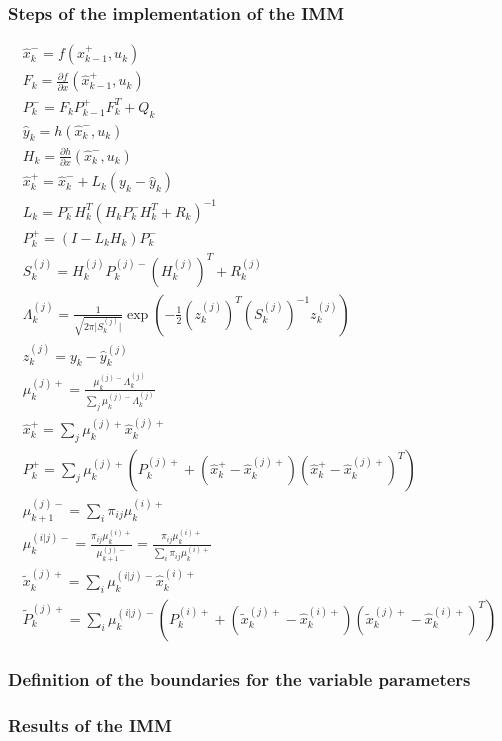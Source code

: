 \subsubsection{Steps of the implementation of the IMM}
\begin{gather}
  \hat{x}_k^- = f(\hat{x}_{k-1}^+, u_k)\\
  F_k = \frac{\partial f}{\partial x}(\hat{x}_{k-1}^+, u_k)\\
  P_k^- = F_k P_{k-1}^+ F_k^T + Q_k\\
  \hat{y}_k = h(\hat{x}_k^-, u_k)\\
  H_k = \frac{\partial h}{\partial x}(\hat{x}_k^-, u_k)\\
  \hat{x}_k^+ = \hat{x}_k^- + L_k (y_k - \hat{y}_k)\\
  L_k = P_k^- H_k^T (H_k P_k^- H_k^T + R_k)^{-1}\\
  P_k^+ = (I - L_k H_k) P_k^-\\
  S_k^{(j)} = H_k^{(j)} P_k^{(j)-} (H_k^{(j)})^T + R_k^{(j)}\\
  \Lambda_k^{(j)} = \frac{1}{\sqrt{2 \pi \lvert S_k^{(j)} \rvert}} \exp{\left(-\frac{1}{2}\left(z_k^{(j)}\right)^T \left(S_k^{(j)}\right)^{-1} z_k^{(j)}\right)}\\
  z_k^{(j)} = y_k - \hat{y}_k^{(j)}\\
  \mu_k^{(j)+} = \frac{\mu_k^{(j)-}\Lambda_k^{(j)}}{\sum_{j} \mu_k^{(j)-}\Lambda_k^{(j)}}\\
  \hat{x}_k^+ = \sum_j \mu_k^{(j)+} \hat{x}_k^{(j)+}\\
  P_k^+ = \sum_j \mu_k^{(j)+} \left(P_k^{(j)+} + \left(\hat{x}_k^+ - \hat{x}_k^{(j)+}\right)\left(\hat{x}_k^+ - \hat{x}_k^{(j)+}\right)^T\right)\\
  \mu_{k+1}^{(j)-} = \sum_i \pi_{ij}\mu_k^{(i)+}\\
  \mu_k^{(i|j)-} = \frac{\pi_{ij}\mu_k^{(i)+}}{\mu_{k+1}^{(j)-}} = \frac{\pi_{ij}\mu_k^{(i)+}}{\sum_i \pi_{ij}\mu_k^{(i)+}}\\
  \tilde{x}_k^{(j)+} = \sum_i \mu_k^{(i|j)-} \hat{x}_k^{(i)+}\\
  \tilde{P}_k^{(j)+} = \sum_i \mu_k^{(i|j)-} \left(P_k^{(i)+} + \left(\tilde{x}_k^{(j)+} - \hat{x}_k^{(i)+}\right)\left(\tilde{x}_k^{(j)+} - \hat{x}_k^{(i)+}\right)^T\right)
\end{gather}
\subsubsection{Definition of the boundaries for the variable parameters}
\subsubsection{Results of the IMM} 
